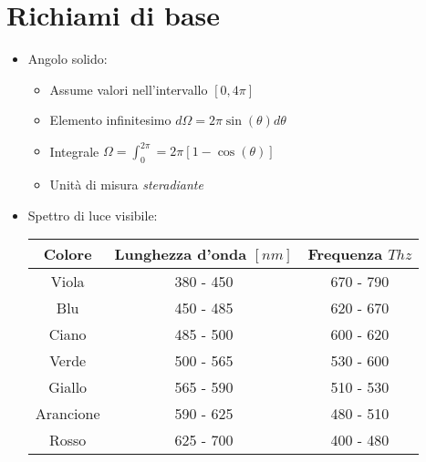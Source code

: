 \documentclass{article}
\begin{document}
\section{Richiami di base}
\begin{itemize}
  \item Angolo solido:
        \begin{itemize}
          \item Assume valori nell'intervallo \( [0, 4 \pi] \)
          \item Elemento infinitesimo \( d \Omega = 2 \pi \sin(\theta) d \theta \)
          \item Integrale \( \displaystyle \Omega = \int_0^{2 \pi} = 2 \pi \left[  1- \cos(\theta) \right] \)
          \item Unità di misura \textit{steradiante}
        \end{itemize}
  \item Spettro di luce visibile:
        \begin{table}[h]
          \centering
          \renewcommand{\arraystretch}{2}
          \begin{tabular}{|c|c|c|}
            \hline
            \textbf{Colore} & \textbf{Lunghezza d'onda \([nm]\)} & \textbf{Frequenza \(Thz\)} \\ \hline
            Viola           & 380 - 450                          & 670 - 790                  \\ \hline
            Blu             & 450 - 485                          & 620 - 670                  \\ \hline
            Ciano           & 485 - 500                          & 600 - 620                  \\ \hline
            Verde           & 500 - 565                          & 530 - 600                  \\ \hline
            Giallo          & 565 - 590                          & 510 - 530                  \\ \hline
            Arancione       & 590 - 625                          & 480 - 510                  \\ \hline
            Rosso           & 625 - 700                          & 400 - 480                  \\ \hline
          \end{tabular}
        \end{table}
\end{itemize}
\newpage
\end{document}
